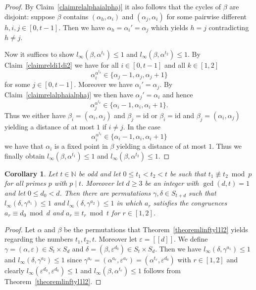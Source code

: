 \documentclass{article}
\newtheorem{corollary}{Corollary}
\newcommand{\llbracket}{[\![}
\newcommand{\rrbracket}{]\!]}
\begin{document}
\begin{proof}
By Claim~\ref{claimrelalphaialphaj} it also follows that the cycles of $\beta$ are disjoint: suppose $\beta$ contains $(\alpha_h,\alpha_i)$ and $(\alpha_j,\alpha_i)$ for some pairwise different $h,i,j \in [0,t-1]$. Then we have $\alpha_h = \alpha_i' = \alpha_j$ which yields $h = j$ contradicting $h \neq j$.

Now it suffices to show $l_\infty(\beta, \alpha^{t_1}) \leq 1$ and $l_\infty(\beta, \alpha^{t_2}) \leq 1$. By Claim~\ref{claimreldi1di2} we have for all $i \in [0,t-1]$ and all $k \in [1,2]$
\begin{displaymath}
\alpha_i^{\alpha^{t_k}} \in \{\alpha_j-1,\alpha_j,\alpha_j+1\}
\end{displaymath}
for some $j \in [0,t-1]$. Moreover we have $\alpha_i' = \alpha_j$. By Claim~\ref{claimrelalphaialphaj} we then have $\alpha_j' = \alpha_i$ and hence
\begin{displaymath}
\alpha_j^{\alpha^{t_k}} \in \{\alpha_i-1,\alpha_i,\alpha_i+1\}.
\end{displaymath}
Thus we either have $\beta_i = (\alpha_i, \alpha_j)$ and $\beta_j = \mathrm{id}$ or $\beta_i = \mathrm{id}$ and $\beta_j = (\alpha_i, \alpha_j)$ yielding a distance of at most $1$ if $i \neq j$. In the case
\begin{displaymath}
\alpha_i^{\alpha^{t_k}} \in \{\alpha_i-1,\alpha_i,\alpha_i+1\}
\end{displaymath}
we have that $\alpha_i$ is a fixed point in $\beta$ yielding a distance of at most $1$. Thus we finally obtain $l_\infty(\beta, \alpha^{t_1}) \leq 1$ and $l_\infty(\beta, \alpha^{t_2}) \leq 1$.
\end{proof}

\begin{corollary}\label{corollarylinftyl1l2}
Let $t \in \mathbb{N}$ be odd and let $0 \leq t_1 < t_2 < t$ be such that $t_1 \not \equiv t_2 \bmod p$ for all primes $p$ with $p \mid t$. Moreover let $d \geq 3$ be an integer with $\gcd(d,t) = 1$ and let $0 \leq d_0 < d$. Then there are permutations $\gamma, \delta \in S_{t+d}$ such that $l_\infty(\delta, \gamma^{a_1}) \leq 1$ and $l_\infty(\delta, \gamma^{a_2}) \leq 1$ in which $a_r$ satisfies the congruences $a_r \equiv d_0 \bmod d$ and $a_r \equiv t_r \bmod t$ for $r \in [1,2]$.
\end{corollary}
\begin{proof}
Let $\alpha$ and $\beta$ be the permutations that Theorem~\ref{theoremlinftyl1l2} yields regarding the numbers $t_1,t_2,t$. Moreover let $\varepsilon = \llbracket d \rrbracket$. We define $\gamma = (\alpha,\varepsilon) \in S_t \times S_d$ and $\delta = (\beta,\varepsilon^{d_0}) \in S_t \times S_d$. Then we have $l_\infty(\delta,\gamma^{a_1}) \leq 1$ and $l_\infty(\delta,\gamma^{a_2}) \leq 1$ since $\gamma^{a_r} = (\alpha^{a_r},\varepsilon^{a_r}) = (\alpha^{t_r},\varepsilon^{d_0})$ with $r \in [1,2]$ and clearly $l_\infty(\varepsilon^{d_0},\varepsilon^{d_0}) \leq 1$ and $l_\infty(\beta,\alpha^{t_r}) \leq 1$ follows from Theorem~\ref{theoremlinftyl1l2}.
\end{proof}
\end{document}
